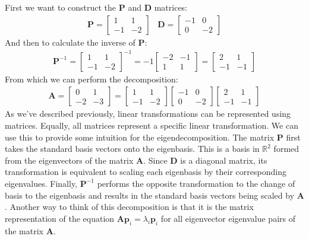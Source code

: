 \documentclass[a4paper,12pt]{article}
\newcommand{\matrx}[1]{\bm{#1}}
\newcommand{\vectr}[1]{\textbf{#1}}
\newcommand{\real}{\mathbb{R}}
\begin{document}
	First we want to construct the $ \matrx{P} $ and $ \matrx{D} $ matrices: 
	\begin{align}
		\matrx{P} = \begin{bmatrix}
			1 & 1 \\
			-1 & -2 
		\end{bmatrix} \hspace{10pt} \matrx{D} = \begin{bmatrix}
			-1 & 0 \\
			0 & -2 
		\end{bmatrix} 
	\end{align}
	And then to calculate the inverse of $ \matrx{P} $: 
	\begin{align}
		\matrx{P}^{-1} = \begin{bmatrix}
			1 & 1 \\
			-1 & -2 
		\end{bmatrix}^{-1} = -1 \begin{bmatrix}
			-2 & -1 \\
			1 & 1 
		\end{bmatrix} = \begin{bmatrix}
			2 & 1 \\
			-1 & -1	
		\end{bmatrix}
	\end{align}
	From which we can perform the decomposition:
	\begin{align}
		\matrx{A} = \begin{bmatrix}
			0 & 1 \\
			-2 & -3
		\end{bmatrix} = \begin{bmatrix}
			1 & 1 \\
			-1 & -2
		\end{bmatrix} \begin{bmatrix}
			-1 & 0 \\
			0 & -2
		\end{bmatrix} \begin{bmatrix}
			2 & 1 \\
			-1 & -1 
		\end{bmatrix}
	\end{align}
	As we've described previously, linear transformations can be represented using matrices. Equally, all matrices represent a specific linear transformation. We can use this to provide some intuition for the eigendecomposition. The matrix $ \matrx{P} $ first takes the standard basis vectors onto the eigenbasis. This is a basis in $ \real^2 $ formed from the eigenvectors of the matrix $ \matrx{A} $. Since $ \matrx{D} $ is a diagonal matrix, its transformation is equivalent to scaling each eigenbasis by their corresponding eigenvalues. Finally, $ \matrx{P}^{-1} $ performs the opposite transformation to the change of basis to the eigenbasis and results in the standard basis vectors being scaled by $ \matrx{A} $. Another way to think of this decomposition is that it is the matrix representation of the equation $ \matrx{A}\vectr{p}_i = \lambda_i\vectr{p}_i $ for all eigenvector eigenvalue pairs of the matrix $ \matrx{A} $. \\
\end{document}
